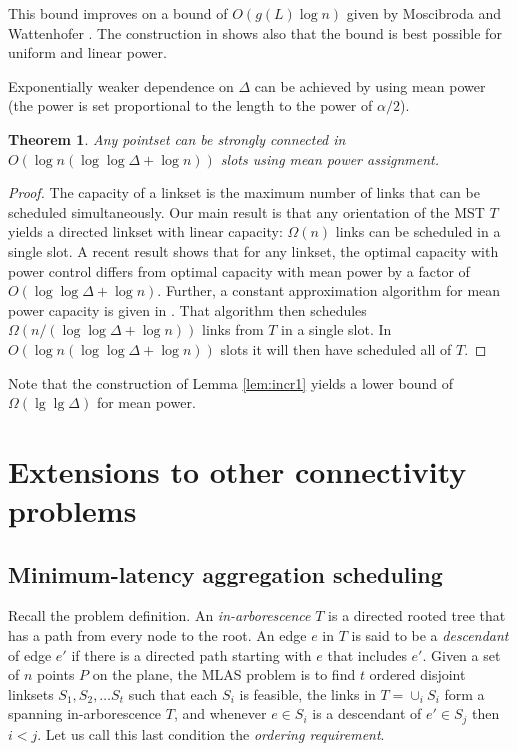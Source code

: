 \documentclass[11pt]{amsart}
\newcounter{foo}
\newtheorem{theorem}[foo]{Theorem}
\begin{document}
This bound improves on a bound of $O(g(L)\log n)$ given by Moscibroda
and Wattenhofer \cite{MoWa06}. The construction in \cite{MoWa06} shows
also that the bound is best possible for uniform and linear power.

Exponentially weaker dependence on $\Delta$ can be achieved by using
mean power (the power is set proportional to the length to the power of $\alpha/2$).

\begin{theorem}
Any pointset can be strongly connected in $O(\log n(\log\log \Delta +
\log n))$ slots using mean power assignment.
\label{loglogdelta}
\end{theorem}


\begin{proof}
The capacity of a linkset is the maximum number of links that can be
scheduled simultaneously.  Our main result is that any orientation of
the MST $T$ yields a directed linkset with linear capacity: $\Omega(n)$ 
links can be scheduled in a single slot. 
A recent result \cite{SODA11} shows that for any linkset, the
optimal capacity with power control differs from optimal capacity with
mean power by a factor of $O(\log\log \Delta + \log n)$.
Further, a constant approximation algorithm for mean power capacity is
given in \cite{SODA11}. That algorithm then schedules $\Omega(n/(\log
\log \Delta + \log n))$ links from $T$ in a single slot. 
In $O(\log n (\log\log \Delta + \log n))$ slots it will then have
scheduled all of $T$.
\end{proof}


Note that the construction of Lemma \ref{lem:incr1} yields a lower
bound of $\Omega(\lg\lg \Delta)$ for mean power.

\section{Extensions to other connectivity problems}
\label{sec:design}

\subsection{Minimum-latency aggregation scheduling}

Recall the problem definition.  An \emph{in-arborescence} $T$ is a
directed rooted tree that has a path from every node to the root. An
edge $e$ in $T$ is said to be a \emph{descendant} of edge $e'$ if
there is a directed path starting with $e$ that includes $e'$.
Given a set of $n$ points $P$ on the plane, 
the MLAS problem is to
find $t$ ordered disjoint linksets $S_1, S_2, \ldots S_t$  such that
each $S_i$ is feasible, the links in $T = \cup_i S_i$ form a spanning in-arborescence $T$, and whenever $e \in S_i$ is a descendant of $e' \in S_j$ then $i < j$. Let us call this last condition the 
\emph{ordering requirement}.
\end{document}
